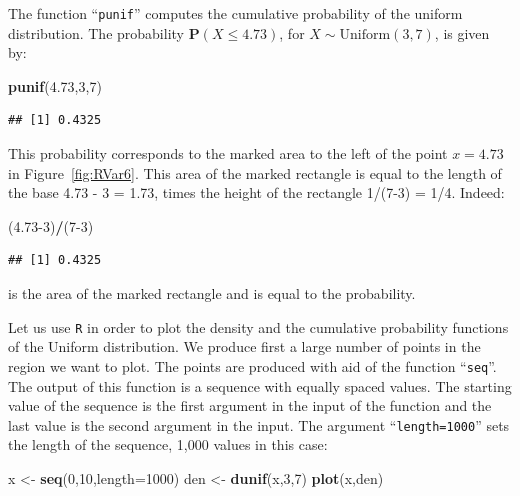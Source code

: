 \documentclass[]{krantz}
\makeatletter
\newenvironment{Shaded}{\begin{snugshade}}{\end{snugshade}}
\newcommand{\DataTypeTok}[1]{\textcolor[rgb]{0.13,0.29,0.53}{#1}}
\newcommand{\DecValTok}[1]{\textcolor[rgb]{0.00,0.00,0.81}{#1}}
\newcommand{\FloatTok}[1]{\textcolor[rgb]{0.00,0.00,0.81}{#1}}
\newcommand{\KeywordTok}[1]{\textcolor[rgb]{0.13,0.29,0.53}{\textbf{#1}}}
\newcommand{\NormalTok}[1]{#1}
\newcommand{\OperatorTok}[1]{\textcolor[rgb]{0.81,0.36,0.00}{\textbf{#1}}}
\newcommand{\StringTok}[1]{\textcolor[rgb]{0.31,0.60,0.02}{#1}}
\newcommand{\Prob}{\mathbf{P}}
\newenvironment{kframe}{%
\medskip{}
\setlength{\fboxsep}{.8em}
 \def\at@end@of@kframe{}%
 \ifinner\ifhmode%
  \def\at@end@of@kframe{\end{minipage}}%
  \begin{minipage}{\columnwidth}%
 \fi\fi%
 \def\FrameCommand##1{\hskip\@totalleftmargin \hskip-\fboxsep
 \colorbox{shadecolor}{##1}\hskip-\fboxsep
     \hskip-\linewidth \hskip-\@totalleftmargin \hskip\columnwidth}%
 \MakeFramed {\advance\hsize-\width
   \@totalleftmargin\z@ \linewidth\hsize
   \@setminipage}}%
 {\par\unskip\endMakeFramed%
 \at@end@of@kframe}
\renewenvironment{Shaded}{\begin{kframe}}{\end{kframe}}
\theoremstyle{definition}
\theoremstyle{definition}
\theoremstyle{definition}
\theoremstyle{remark}
\makeatother
\begin{document}
The function ``\texttt{punif}'' computes the cumulative probability of the
uniform distribution. The probability \(\Prob(X \leq 4.73)\), for
\(X \sim \mathrm{Uniform}(3,7)\), is given by:

\begin{Shaded}
\begin{Highlighting}[]
\KeywordTok{punif}\NormalTok{(}\FloatTok{4.73}\NormalTok{,}\DecValTok{3}\NormalTok{,}\DecValTok{7}\NormalTok{)}
\end{Highlighting}
\end{Shaded}

\begin{verbatim}
## [1] 0.4325
\end{verbatim}

This probability corresponds to the marked area to the left of the point
\(x = 4.73\) in Figure~\ref{fig:RVar6}. This area of the marked
rectangle is equal to the length of the base 4.73 - 3 = 1.73, times the
height of the rectangle 1/(7-3) = 1/4. Indeed:

\begin{Shaded}
\begin{Highlighting}[]
\NormalTok{(}\FloatTok{4.73}\DecValTok{-3}\NormalTok{)}\OperatorTok{/}\NormalTok{(}\DecValTok{7-3}\NormalTok{)}
\end{Highlighting}
\end{Shaded}

\begin{verbatim}
## [1] 0.4325
\end{verbatim}

is the area of the marked rectangle and is equal to the probability.

Let us use \texttt{R} in order to plot the density and the cumulative
probability functions of the Uniform distribution. We produce first a
large number of points in the region we want to plot. The points are
produced with aid of the function ``\texttt{seq}''. The output of this function
is a sequence with equally spaced values. The starting value of the
sequence is the first argument in the input of the function and the last
value is the second argument in the input. The argument ``\texttt{length=1000}''
sets the length of the sequence, 1,000 values in this case:

\begin{Shaded}
\begin{Highlighting}[]
\NormalTok{x <-}\StringTok{ }\KeywordTok{seq}\NormalTok{(}\DecValTok{0}\NormalTok{,}\DecValTok{10}\NormalTok{,}\DataTypeTok{length=}\DecValTok{1000}\NormalTok{)}
\NormalTok{den <-}\StringTok{ }\KeywordTok{dunif}\NormalTok{(x,}\DecValTok{3}\NormalTok{,}\DecValTok{7}\NormalTok{)}
\KeywordTok{plot}\NormalTok{(x,den)}
\end{Highlighting}
\end{Shaded}
\end{document}
